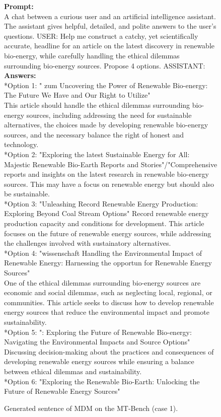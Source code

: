 \newpage

\begin{figure}[t!]
    {\selectfont
    \textbf{Prompt:} \\
    A chat between a curious user and an artificial intelligence assistant. The assistant gives helpful, detailed, and polite answers to the user's questions. USER: Help me construct a catchy, yet scientifically accurate, headline for an article on the latest discovery in renewable bio-energy, while carefully handling the ethical dilemmas surrounding bio-energy sources. Propose 4 options. ASSISTANT: \\
    \textbf{Answers:}\\
    *Option 1: " zum Uncovering the Power of Renewable Bio-energy: The Future We Have and Our Right to Utilize" \\
    This article should handle the ethical dilemmas surrounding bio-energy sources, including addressing the need for sustainable alternatives, the choices made by developing renewable bio-energy sources, and the necessary balance the right of honest and technology. \\
    *Option 2: "Exploring the latest Sustainable Energy for All: Majestic Renewable Bio-Earth Reports and Stories"/"Comprehensive reports and insights on the latest research in renewable bio-energy sources. This may have a focus on renewable energy but should also be sustainable. \\
    *Option 3: "Unleashing Record Renewable Energy Production: Exploring Beyond Coal Stream Options"
    Record renewable energy production capacity and conditions for development. This article focuses on the future of renewable energy sources, while addressing the challenges involved with sustainatory alternatives. \\
    *Option 4: "wissenschaft Handling the Environmental Impact of Renewable Energy: Harnessing the opportun for Renewable Energy Sources" \\
    One of the ethical dilemmas surrounding bio-energy sources are economic and social dilemmas, such as neglecting local, regional, or communities. This article seeks to discuss how to develop renewable energy sources that reduce the environmental impact and promote sustainability. \\
    *Option 5: ": Exploring the Future of Renewable Bio-energy: Navigating the Environmental Impacts and Source Options" \\
    Discussing decision-making about the practices and consequences of developing renewable energy sources while ensuring a balance between ethical dilemmas and sustainability. \\
    *Option 6: "Exploring the Renewable Bio-Earth: Unlocking the Future of Renewable Energy Sources"}
\caption{Generated sentence of MDM on the MT-Bench (case 1).}
\label{fig:app_generative_samples_1}
\end{figure}


